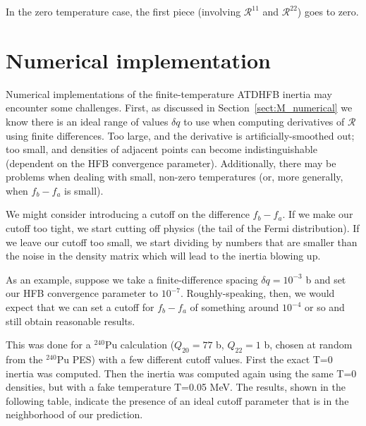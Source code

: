 \noindent In the zero temperature case, the first piece (involving $\mathcal{R}^{11}$ and $\mathcal{R}^{22}$) goes to zero.

\section{Numerical implementation}

Numerical implementations of the finite-temperature ATDHFB inertia may encounter some challenges. First, as discussed in Section~\ref{sect:M_numerical} we know there is an ideal range of values $\delta q$ to use when computing derivatives of $\mathcal{R}$ using finite differences. Too large, and the derivative is artificially-smoothed out; too small, and densities of adjacent points can become indistinguishable (dependent on the HFB convergence parameter). Additionally, there may be problems when dealing with small, non-zero temperatures (or, more generally, when $f_b-f_a$ is small).
%
%

We might consider introducing a cutoff on the difference $f_b-f_a$. If we make our cutoff too tight, we start cutting off physics (the tail of the Fermi distribution). If we leave our cutoff too small, we start dividing by numbers that are smaller than the noise in the density matrix which will lead to the inertia blowing up.

As an example, suppose we take a finite-difference spacing $\delta q = 10^{-3}$ b and set our HFB convergence parameter to $10^{-7}$. Roughly-speaking, then, we would expect that we can set a cutoff for $f_b-f_a$ of something around $10^{-4}$ or so and still obtain reasonable results.

This was done for a $^{240}$Pu calculation ($Q_{20}=77$ b, $Q_{22}=1$ b, chosen at random from the $^{240}$Pu PES) with a few different cutoff values. First the exact T=0 inertia was computed. Then the inertia was computed again using the same T=0 densities, but with a fake temperature T=0.05 MeV. The results, shown in the following table, indicate the presence of an ideal cutoff parameter that is in the neighborhood of our prediction.

